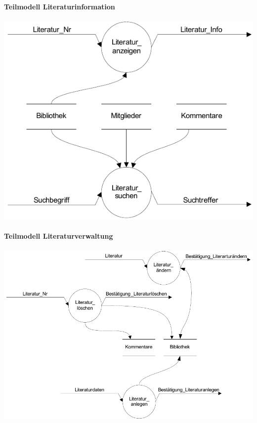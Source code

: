\paragraph{Teilmodell Literaturinformation}
\includegraphics[scale=1.0]{teilmodell_literaturinformation}

\paragraph{Teilmodell Literaturverwaltung}
\includegraphics[scale=0.93]{teilmodell_bibliotheksverwaltung}

